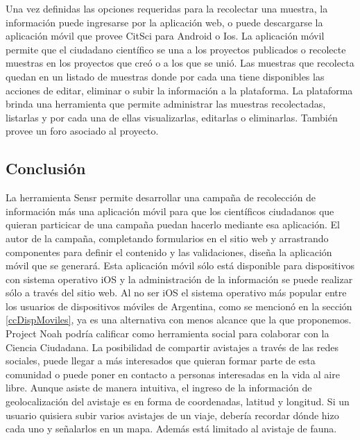 Una vez definidas las opciones requeridas para la recolectar una muestra, la información puede ingresarse por la aplicación web, o puede descargarse la aplicación móvil que provee CitSci para Android o Ios. La aplicación móvil permite que el ciudadano científico se una a los proyectos publicados o recolecte muestras en los proyectos que creó o a los que se unió. Las muestras que recolecta quedan en un listado de muestras donde por cada una tiene disponibles las acciones de editar, eliminar o subir la información a la plataforma.  		
La plataforma brinda una herramienta que permite administrar las muestras recolectadas, listarlas y por cada una de ellas visualizarlas, editarlas o eliminarlas. También provee un foro asociado al proyecto. 	
			


\subsection{Conclusión}
La herramienta Sensr permite desarrollar una campaña de recolección de información más una aplicación móvil para que los científicos ciudadanos que quieran particicar de una campaña puedan hacerlo mediante esa aplicación. El autor de la campaña, completando formularios en el sitio web y arrastrando componentes para definir el contenido y las validaciones, diseña la aplicación móvil que se generará. Esta aplicación móvil sólo está disponible para dispositivos con sistema operativo iOS y la administración de la información se puede realizar sólo a través del sitio web. Al no ser iOS el sistema operativo más popular entre los usuarios de dispositivos móviles de Argentina, como se mencionó en la sección \ref{ccDispMoviles}, ya es una alternativa con menos alcance que la que proponemos. 
Project Noah podría calificar como herramienta social para colaborar con la Ciencia Ciudadana. La posibilidad de compartir avistajes a través de las redes sociales, puede llegar a más interesados que quieran formar parte de esta comunidad o puede poner en contacto a personas interesadas en la vida al aire libre.
Aunque asiste de manera intuitiva, el ingreso de la información de geolocalización del avistaje es en forma de coordenadas, latitud y longitud. Si un usuario quisiera subir varios avistajes de un viaje, debería recordar dónde hizo cada uno y señalarlos en un mapa. Además está limitado al avistaje de fauna.
